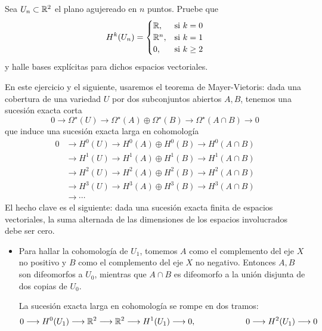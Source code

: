 \begin{exercise}
Sea $U_n \subset \mathbb R^2$ el plano agujereado en $n$ puntos. Pruebe que
$$
H^k(U_n) =
    \begin{cases}
        \mathbb R, & \text{si } k = 0 \\
        \mathbb R^n, & \text{si } k = 1 \\
        0, & \text{si } k \ge 2
    \end{cases}
$$
y halle bases explícitas para dichos espacios vectoriales.
\end{exercise}

\begin{solution}
En este ejercicio y el siguiente, usaremos el teorema de Mayer-Vietoris: dada una cobertura de una variedad $U$ por dos subconjuntos abiertos $A, B$, tenemos una sucesión exacta corta
$$
0
    \longrightarrow \Omega^\star(U)
    \longrightarrow \Omega^\star(A) \oplus \Omega^\star(B)
    \longrightarrow \Omega^\star(A \cap B)
    \longrightarrow 0
$$
que induce una sucesión exacta larga en cohomología
\begin{align*}
0 & \longrightarrow H^0(U) \longrightarrow H^0(A) \oplus H^0(B) \longrightarrow H^0(A \cap B) \\
  & \longrightarrow H^1(U) \longrightarrow H^1(A) \oplus H^1(B) \longrightarrow H^1(A \cap B) \\
  & \longrightarrow H^2(U) \longrightarrow H^2(A) \oplus H^2(B) \longrightarrow H^2(A \cap B) \\
  & \longrightarrow H^3(U) \longrightarrow H^3(A) \oplus H^3(B) \longrightarrow H^3(A \cap B) \\
  & \longrightarrow \cdots
\end{align*}
El hecho clave es el siguiente: dada una sucesión exacta finita de espacios vectoriales, la suma alternada de las dimensiones de los espacios involucrados debe ser cero.
\begin{itemize}
    \item Para hallar la cohomología de $U_1$, tomemos $A$ como el complemento del eje $X$ no positivo y $B$ como el complemento del eje $X$ no negativo. Entonces $A, B$ son difeomorfos a $U_0$, mientras que $A \cap B$ es difeomorfo a la unión disjunta de dos copias de $U_0$.
    
    La sucesión exacta larga en cohomología se rompe en dos tramos:
    $$0 \longrightarrow H^0(U_1) \longrightarrow \mathbb R^2 \longrightarrow \mathbb R^2 \longrightarrow H^1(U_1) \longrightarrow 0, \qquad \qquad \qquad 0 \longrightarrow H^2(U_1) \longrightarrow 0$$
    

\end{itemize}
\end{solution}
